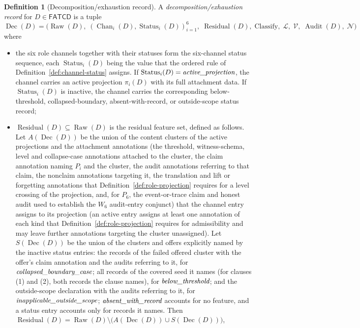 \documentclass[11pt]{article}
\theoremstyle{definition}
\newtheorem{definition}[theorem]{Definition}
\newcommand{\FATCD}{\ensuremath{\mathsf{FATCD}}}
\newcommand{\Raw}[1]{\ensuremath{\operatorname{Raw}\!\left(#1\right)}}
\newcommand{\Audit}[1]{\ensuremath{\operatorname{Audit}\!\left(#1\right)}}
\newcommand{\Dec}[1]{\ensuremath{\operatorname{Dec}\!\left(#1\right)}}
\newcommand{\Residual}[1]{\ensuremath{\operatorname{Residual}\!\left(#1\right)}}
\newcommand{\Chan}[2]{\ensuremath{\operatorname{Chan}_{#1}\!\left(#2\right)}}
\newcommand{\Status}[2]{\ensuremath{\operatorname{Status}_{#1}\!\left(#2\right)}}
\newcommand{\activeproj}{\textit{active\_\allowbreak projection}}
\newcommand{\belowthr}{\textit{below\_\allowbreak threshold}}
\newcommand{\collapsedbc}{\textit{collapsed\_\allowbreak boundary\_\allowbreak case}}
\newcommand{\absentrec}{\textit{absent\_\allowbreak with\_\allowbreak record}}
\newcommand{\outsidescope}{\textit{inapplicable\_\allowbreak outside\_\allowbreak scope}}
\begin{document}
\begin{definition}[Decomposition/exhaustion record]\label{def:decomposition-record}
A \emph{decomposition/exhaustion record} for \(D \in \FATCD{}\) is a tuple
\[
\Dec{D} = \bigl(\Raw{D},\; (\Chan{i}{D}, \Status{i}{D})_{i=1}^{6},\;
\Residual{D},\; \mathrm{Classify},\; \mathcal{L},\; \mathcal{V},\;
\Audit{D},\; \mathcal{N}\bigr)
\]
where
\begin{itemize}[topsep=2pt,itemsep=1pt]
  \item the six role channels together with their statuses form the
    six-channel status sequence, each \(\Status{i}{D}\) being the value that the
    ordered rule of Definition~\ref{def:channel-status} assigns. If \(\Status{i}{D} = \activeproj\), the channel
    carries an active projection \(\pi_i(D)\) with its full attachment
    data. If \(\Status{i}{D}\) is inactive, the channel carries the
    corresponding below-threshold, collapsed-boundary,
    absent-with-record, or outside-scope status record;
  \item \(\Residual{D} \subseteq \Raw{D}\) is the residual feature set,
    defined as follows. Let \(A(\Dec{D})\) be the union of the content
    clusters of the active projections and the attachment annotations (the
    threshold, witness-schema, level and collapse-case annotations attached to
    the cluster, the claim annotation naming \(P_i\) and the cluster, the audit
    annotations referring to that claim, the nonclaim annotations targeting it, the translation and lift or
    forgetting annotations that Definition~\ref{def:role-projection} requires for
    a level crossing of the projection, and,
    for \(P_6\), the event-or-trace claim and honest audit used to establish
    the \(W_6\) audit-entry conjunct)
    that the channel entry assigns to its projection (an active entry assigns at least one annotation of each kind that Definition~\ref{def:role-projection} requires for admissibility and may leave further annotations targeting the cluster unassigned). Let \(S(\Dec{D})\) be the union of the
    clusters and offers explicitly named by the inactive status entries: the
    records of the failed offered cluster with the offer's claim annotation and the audits referring to it, for \(\collapsedbc\); all records of the covered seed it names (for clauses (1) and (2), both records the clause names), for
    \(\belowthr\); and the outside-scope declaration with the audits referring to it, for
    \(\outsidescope\); \(\absentrec\) accounts for no feature, and a status
    entry accounts only for records it names. Then
    \(\Residual{D}=\Raw{D}\setminus\bigl(A(\Dec{D})\cup S(\Dec{D})\bigr)\),

\end{itemize}
\end{definition}
\end{document}
